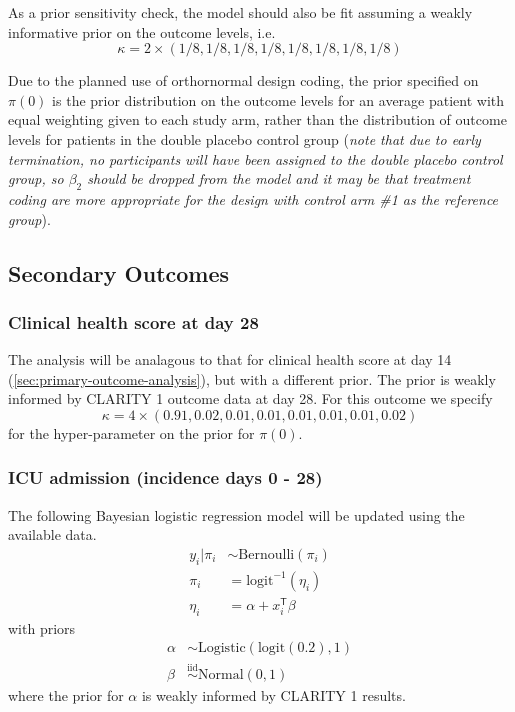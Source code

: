 \documentclass[11pt,parskip=half-]{scrartcl}
\begin{document}
As a prior sensitivity check, the model should also be fit assuming a weakly informative prior on the outcome levels, i.e.
$$
\kappa = 2 \times (1/8, 1/8, 1/8, 1/8, 1/8, 1/8, 1/8, 1/8)
$$

Due to the planned use of orthornormal design coding, the prior specified on $\pi(0)$ is the prior distribution on the outcome levels for an average patient with equal weighting given to each study arm, rather than the distribution of outcome levels for patients in the double placebo control group (\textit{note that due to early termination, no participants will have been assigned to the double placebo control group, so $\beta_2$ should be dropped from the model and it may be that treatment coding are more appropriate for the design with control arm \#1 as the reference group}).

\subsection{Secondary Outcomes}

\subsubsection{Clinical health score at day 28}
The analysis will be analagous to that for clinical health score at day 14 (\ref{sec:primary-outcome-analysis}), but with a different prior. The prior is weakly informed by CLARITY 1 outcome data at day 28. For this outcome we specify
$$
    \kappa = 4\times(0.91, 0.02, 0.01, 0.01, 0.01, 0.01, 0.01, 0.02)
$$
for the hyper-parameter on the prior for $\pi(0)$.

\subsubsection{ICU admission (incidence days 0 - 28)}\label{sec:icu-analysis}
The following Bayesian logistic regression model will be updated using the available data.
$$
    \begin{aligned}
        y_i|\pi_i & \sim \text{Bernoulli}(\pi_i)   \\
        \pi_i     & = \text{logit}^{-1}(\eta_i)    \\
        \eta_i    & = \alpha + x_i^\mathsf{T}\beta
    \end{aligned}
$$
with priors
$$
    \begin{aligned}
        \alpha & \sim \text{Logistic}(\text{logit}(0.2), 1)     \\
        \beta  & \overset{\text{iid}}{\sim} \text{Normal}(0, 1)
    \end{aligned}
$$
where the prior for $\alpha$ is weakly informed by CLARITY 1 results.
\end{document}
